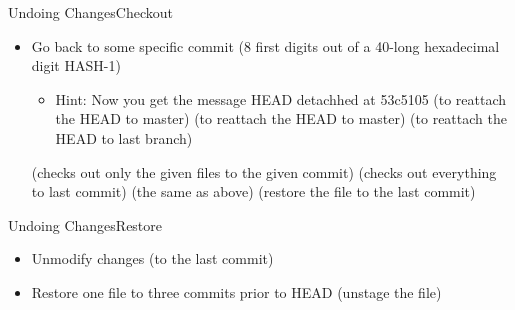 \begin{frame}{Undoing Changes}{Checkout}
\begin{itemize}
\item Go back to some specific commit
 (8 first digits out of a 40-long hexadecimal digit HASH-1)
\begin{itemize}
\item Hint: Now you get the message {\color{red} HEAD detachhed at 53c5105}
   (to reattach the HEAD to master)
   (to reattach the HEAD to master)
   (to reattach the HEAD to last branch)
\end{itemize}
   (checks out only the given files to the given commit)
   (checks out everything to last commit)
   (the same as above)
   (restore the file to the last commit)
\end{itemize}
\end{frame}

\begin{frame}{Undoing Changes}{Restore}
\begin{itemize}
  \item Unmodify changes (to the last commit)
  \item Restore one file to three commits prior to HEAD
     (unstage the file)
\end{itemize}
\end{frame}

%
